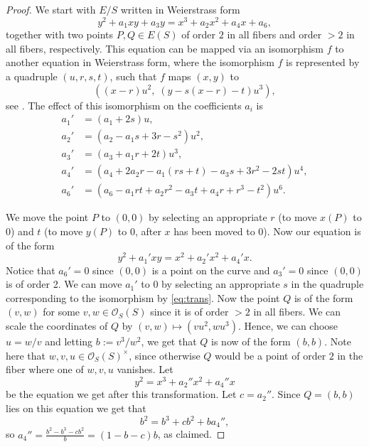 \documentclass[11pt,reqno]{amsart}
\theoremstyle{definition}
\numberwithin{equation}{section}
\newcommand{\OO}{\mathcal{O}}
\begin{document}
\begin{proof}
We start with $E/S$ written in Weierstrass form
\begin{equation}
    y^2+a_1xy+a_3y=x^3+a_2x^2+a_4x+a_6,
\end{equation}
together with two points $P,Q\in E(S)$ of order $2$ in all fibers and order $>2$ in all fibers, respectively. This equation can be mapped via an isomorphism $f$ to another equation in 
Weierstrass form, where the isomorphism $f$ is represented by a quadruple $(u,r,s,t)$, such that $f$ maps $(x,y)$ to 
$$((x-r)u^2, \; (y - s(x-r) - t)u^3),$$
see \cite[Proposition VII.1.3]{silverman}. The effect of this isomorphism on the coefficients $a_i$ is
\begin{equation} \label{eq:trans}
    \begin{split}a_1' &= (a_1 + 2s) u, \\
a_2' &= (a_2 - a_1s + 3r - s^2)u^2, \\
a_3' &= (a_3 + a_1r + 2t)u^3, \\
a_4' &= (a_4 + 2a_2r - a_1(rs+t) - a_3s + 3r^2 - 2st)u^4, \\
a_6' &= (a_6 - a_1rt + a_2r^2 - a_3t + a_4r + r^3 - t^2)u^6 .\end{split}
\end{equation}




We move the point $P$ to $(0,0)$ by selecting an appropriate $r$ (to move $x(P)$ to $0$) and $t$ (to move $y(P)$ to $0$, after $x$ has been moved to $0$). Now our equation is of the form
$$y^2+a_1'xy=x^2+a_2'x^2+a_4'x.$$ Notice that $a_6'=0$ since $(0,0)$ is a point on the curve and $a_3'=0$ since $(0,0)$ is of order 2.  We can move $a_1'$ to $0$ by selecting an appropriate $s$ in the quadruple corresponding to the isomorphism by \eqref{eq:trans}. Now the point $Q$ is of the form $(v,w)$ for some $v,w \in \OO_S(S)$ since it is of order $>2$ in all fibers. We can scale the coordinates of $Q$ by $(v,w)\mapsto(vu^2, wu^3)$. Hence, we can choose $u=w/v$ and letting $b:=v^3/w^2$, we get that $Q$ is now of the form $(b,b)$. 
Note here that $w,v,u\in \OO_S(S)^\times$, since otherwise $Q$ would be a point of order $2$ in the fiber where one of $w,v,u$ vanishes. 
Let 
$$y^2=x^3+a_2''x^2+a_4''x$$
be the equation we get after this transformation.
Let $c=a_2''$. Since $Q=(b,b)$ lies on this equation we get that
$$b^2=b^3+cb^2+ba_4'',$$
so $a_4''=\frac{b^2-b^3-cb^2}{b}=(1-b-c)b$, as claimed. 
\end{proof}
\end{document}
